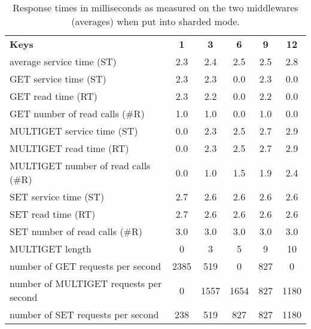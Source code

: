 \documentclass[11pt,a4paper]{article}
\let\tb\textbf
\begin{document}
\begin{table}
\centering
    \scriptsize{
		\begin{tabular}{|l||c|c|c|c|c|} \hline 
		\tb{Keys}                           & \tb{1}    &      \tb{3}     &     \tb{6}       &   \tb{9}  &       \tb{12}   \\ \hhline{|=|=|=|=|=|=|}  
        average service time (ST)           &  2.3     &    2.4     &    2.5    &     2.5    &     2.8 \\\Xhline{2\arrayrulewidth}
        GET service time (ST)               &   2.3    &     2.3   &      0.0   &      2.3   &      0.0   \\
        GET read time (RT)                  &    2.3   &      2.2   &      0.0  &       2.2  &       0.0  \\
        GET number of read calls (\#R)      &  1.0     &    1.0     &    0.0    &     1.0    &     0.0    \\\Xhline{2\arrayrulewidth}
        MULTIGET service time (ST)          &    0.0   &      2.3   &      2.5  &       2.7  &       2.9   \\
        MULTIGET read time (RT)             &  0.0     &    2.3     &    2.5    &     2.7     &    2.9  \\
        MULTIGET number of read calls (\#R) &   0.0    &     1.0    &     1.5   &      1.9    &     2.4    \\\Xhline{2\arrayrulewidth}
        SET service time (ST)               &    2.7   &      2.6   &      2.6  &       2.6  &       2.6   \\
        SET read time (RT)                  &   2.7    &     2.6    &     2.6    &     2.6    &     2.6 \\
        SET number of read calls (\#R)      &  3.0     &    3.0      &   3.0    &     3.0      &   3.0\\\Xhline{2\arrayrulewidth}
        MULTIGET length                     &   0     &    3    &       5      &     9      &    10 \\\Xhline{2\arrayrulewidth}
        number of GET requests per second             &  2385   &      519    &       0   &      827   &        0 \\
        number of MULTIGET requests per second   &     0   &     1557    &    1654    &     827   &     1180\\
        number of SET requests per second               & 238    &     519     &    827      &   827     &   1180 \\ \hline

		\end{tabular}
	}
    \caption{Response times in milliseconds as measured on the two middlewares (averages) when put into sharded mode.}
    \label{tbl:non_sharded_mw}
\end{table}
\end{document}
